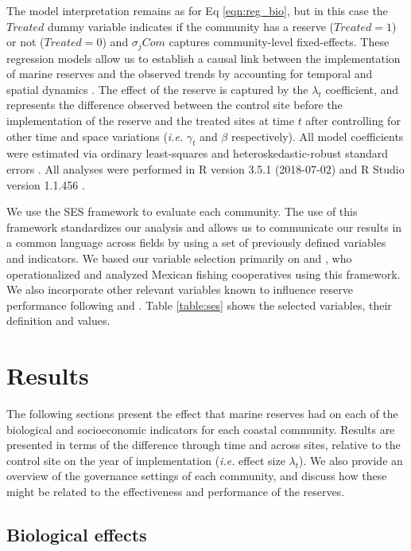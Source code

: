 \documentclass{frontiersSCNS}
\begin{document}
The model interpretation remains as for Eq \ref{eqn:reg_bio}, but in
this case the \(Treated\) dummy variable indicates if the community has
a reserve (\(Treated = 1\)) or not (\(Treated = 0\)) and \(\sigma_jCom\)
captures community-level fixed-effects. These regression models allow us
to establish a causal link between the implementation of marine reserves
and the observed trends by accounting for temporal and spatial dynamics
\citep{depalma_2018}. The effect of the reserve is captured by the
\(\lambda_t\) coefficient, and represents the difference observed
between the control site before the implementation of the reserve and
the treated sites at time \(t\) after controlling for other time and
space variations (\emph{i.e.} \(\gamma_t\) and \(\beta\) respectively).
All model coefficients were estimated via ordinary least-squares and
heteroskedastic-robust standard errors \citep{zeileis_2004-7n}. All
analyses were performed in R version 3.5.1 (2018-07-02) and R Studio
version 1.1.456 \citep{R_2018}.

We use the SES framework to evaluate each community. The use of this
framework standardizes our analysis and allows us to communicate our
results in a common language across fields by using a set of previously
defined variables and indicators. We based our variable selection
primarily on \citet{leslie_2015-na} and \citet{basurto_2013-oq}, who
operationalized and analyzed Mexican fishing cooperatives using this
framework. We also incorporate other relevant variables known to
influence reserve performance following \citet{difranco_2016-Xw} and
\citet{edgar_2014-UO}. Table \ref{table:ses} shows the selected
variables, their definition and values.

\hypertarget{results}{%
\section{Results}\label{results}}

The following sections present the effect that marine reserves had on
each of the biological and socioeconomic indicators for each coastal
community. Results are presented in terms of the difference through time
and across sites, relative to the control site on the year of
implementation (\emph{i.e.} effect size \(\lambda_t\)). We also provide
an overview of the governance settings of each community, and discuss
how these might be related to the effectiveness and performance of the
reserves.

\hypertarget{biological-effects}{%
\subsection{Biological effects}\label{biological-effects}}
\end{document}
